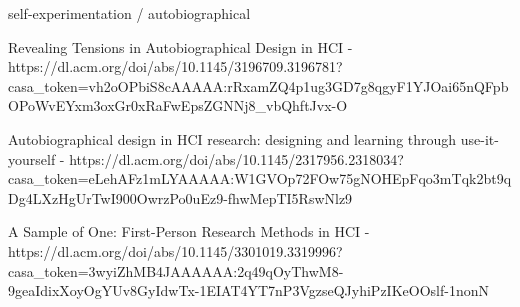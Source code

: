self-experimentation / autobiographical


Revealing Tensions in Autobiographical Design in HCI - https://dl.acm.org/doi/abs/10.1145/3196709.3196781?casa_token=vh2oOPbiS8cAAAAA:rRxamZQ4p1ug3GD7g8qgyF1YJOai65nQFpbOPoWvEYxm3oxGr0xRaFwEpsZGNNj8_vbQhftJvx-O


Autobiographical design in HCI research: designing and learning through use-it-yourself - https://dl.acm.org/doi/abs/10.1145/2317956.2318034?casa_token=eLehAFz1mLYAAAAA:W1GVOp72FOw75gNOHEpFqo3mTqk2bt9qDg4LXzHgUrTwI900OwrzPo0uEz9-fhwMepTI5RswNlz9

A Sample of One: First-Person Research Methods in HCI - https://dl.acm.org/doi/abs/10.1145/3301019.3319996?casa_token=3wyiZhMB4JAAAAAA:2q49qOyThwM8-9geaIdixXoyOgYUv8GyIdwTx-1EIAT4YT7nP3VgzseQJyhiPzIKeOOslf-1nonN
